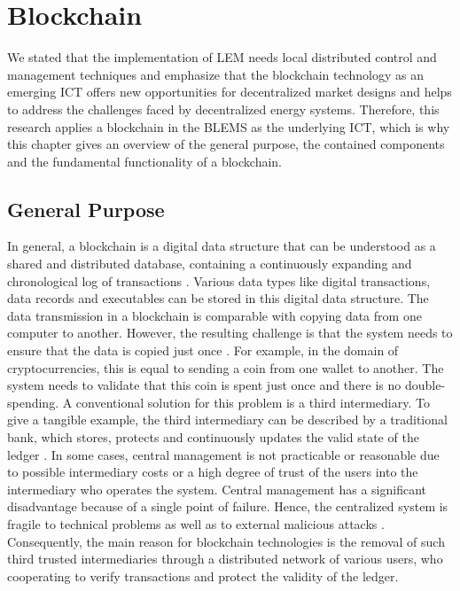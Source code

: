\section{Blockchain}
\label{sec:about_blockchain}

We stated that the implementation of LEM
needs local distributed control and management techniques and emphasize
that the blockchain technology as an emerging ICT offers new opportunities for decentralized
market designs and helps to address the challenges faced by decentralized energy systems. 
Therefore, this research applies a blockchain in the BLEMS as the underlying ICT, which is why
this chapter gives an overview of the general purpose, 
the contained components and the fundamental functionality of a blockchain. 

\subsection{General Purpose}
In general, a blockchain is a digital data structure that can be understood as a shared and 
distributed database, containing a continuously expanding and chronological log of transactions . 
Various data types like digital transactions, data records and executables can be stored in this digital data structure. 
The data transmission in a blockchain is comparable with copying data from one computer to another. However, the resulting challenge 
is that the system needs to ensure that the data is copied just once . 
For example, in the domain of cryptocurrencies, this is equal to sending a coin from one wallet to another. 
The system needs to validate that this coin is spent just once and there is no double-spending. 
A conventional solution for this problem is a third intermediary. To give a tangible example, the third
intermediary can be described by a traditional bank, which stores, protects and continuously updates the valid state of 
the ledger . In some cases, central management is not practicable or reasonable due to 
possible intermediary costs or a high degree of trust of the users into the intermediary who operates 
the system. Central management has a significant disadvantage because of a single point of failure. 
Hence, the centralized system is fragile to technical problems as well as to external malicious attacks .
Consequently, the main reason for blockchain technologies is the removal of such third 
trusted intermediaries through a distributed network of various users, who cooperating 
to verify transactions and protect the validity of the ledger.

